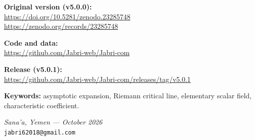\documentclass[11pt,a4paper]{article}
\begin{document}
\vspace{0.5em}
\noindent\textbf{Original version (v5.0.0):}\\
\url{https://doi.org/10.5281/zenodo.23285748}\\
\url{https://zenodo.org/records/23285748}

\vspace{0.5em}
\noindent\textbf{Code and data:}\\
\url{https://github.com/Jabri-web/Jabri-com}

\vspace{0.5em}
\noindent\textbf{Release (v5.0.1):}\\
\url{https://github.com/Jabri-web/Jabri-com/releases/tag/v5.0.1}

\vspace{0.5em}
\noindent\textbf{Keywords:} asymptotic expansion, Riemann critical
line, elementary scalar field, characteristic coefficient.

\vspace{0.8em}
\noindent\textit{Sana'a, Yemen --- October 2026}\\
\noindent\texttt{jabri62018@gmail.com}
\end{document}
